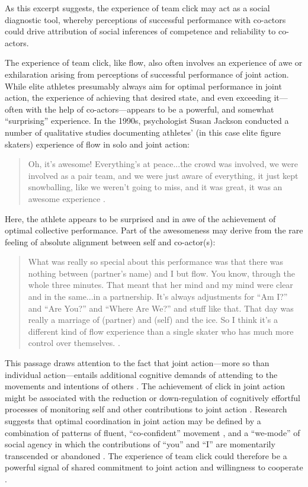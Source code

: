 \begin{CJK}{UTF8}{gbsn}
As this excerpt suggests, the experience of team click may act as a social diagnostic tool, whereby perceptions of successful performance with co-actors could drive attribution of social inferences of competence and reliability to co-actors.

The experience of team click, like flow, also often involves an experience of awe or exhilaration arising from perceptions of successful performance of joint action.  While elite athletes presumably always aim for optimal performance in joint action, the experience of achieving that desired state, and even exceeding it---often with the help of co-actors---appears to be a powerful, and somewhat ``surprising'' experience.  In the 1990s, psychologist Susan Jackson conducted a number of qualitative studies documenting athletes' (in this case elite figure skaters) experience of flow in solo and joint action:

    \begin{quote}
      Oh, it's awesome! Everything's at peace...the crowd was involved, we were involved as a pair team, and we were just aware of everything, it just kept snowballing, like we weren't going to miss, and it was great, it was an awesome experience \citep[168]{Jackson1992}.
    \end{quote}

Here, the athlete appears to be surprised and in awe of the achievement of optimal collective performance.  Part of the awesomeness may derive from the rare feeling of absolute alignment between self and co-actor(s):

    \begin{quote}
      What was really so special about this performance was that there was nothing between (partner's name) and I but flow.  You know, through the whole three minutes.  That meant that her mind and my mind were clear and in the same...in a partnership. It's always adjustments for ``Am I?'' and ``Are You?'' and ``Where Are We?'' and stuff like that.  That day was really a marriage of (partner) and (self) and the ice.  So I think it's a different kind of flow experience than a single skater who has much more control over themselves. \citep[173-4]{Jackson1992}.
    \end{quote}

This passage draws attention to the fact that joint action---more so than individual action---entails additional cognitive demands of attending to the movements and intentions of others \citep{Vesper2010}.  The achievement of click in joint action might be associated with the reduction or down-regulation of cognitively effortful processes of monitoring self and other contributions to joint action \citep{Dietrich2004b}. Research suggests that optimal coordination in joint action may be defined by a combination of patterns of fluent, ``co-confident'' movement \citep[in place of effortful monitoring; see]{Noy2015,Noy2017}, and a ``we-mode'' of social agency in which the contributions of ``you'' and ``I'' are momentarily transcended or abandoned \citep[see][]{Gallotti2013}.
The experience of team click could therefore be a powerful signal of shared commitment to joint action and willingness to cooperate \citep{Reddish2013a}. \\


\end{CJK}
